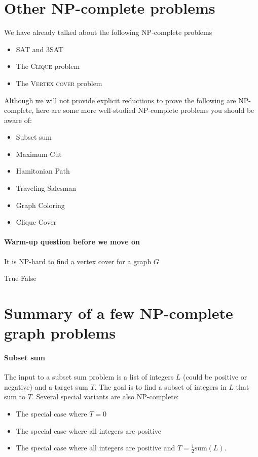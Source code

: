 \documentclass[11  pt]{article}
\begin{document}
\newpage


	\section{Other NP-complete problems}
We have already talked about the following NP-complete problems
\begin{itemize}
	\item SAT and 3SAT
	\item The \textsc{Clique} problem
	\item The \textsc{Vertex cover} problem
\end{itemize}

Although we will not provide explicit reductions to prove the following are NP-complete, here are some more well-studied NP-complete problems you should be aware of:
\begin{itemize}
	\item Subset sum
	\item Maximum Cut
	\item Hamitonian Path
	\item Traveling Salesman
	\item Graph Coloring
	\item Clique Cover
\end{itemize}

\paragraph{Warm-up question before we move on}
\begin{Qu}
	It is NP-hard to find a vertex cover for a graph $G$
	\begin{itemize}
		\aitem True
		\bitem False
	\end{itemize}
\end{Qu}

\newpage
\section{Summary of a few NP-complete graph problems}
\paragraph{Subset sum}
The input to a subset sum problem is a list of integers $L$ (could be positive or negative) and a target sum $T$. The goal is to find a subset of integers in $L$ that sum to $T$. Several special variants are also NP-complete:
\begin{itemize}
	\item The special case where $T = 0$
	\item The special case where all integers are positive
	\item The special case where all integers are positive and $T = \frac{1}{2} \text{sum}(L)$.
\end{itemize}
\end{document}

